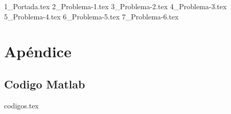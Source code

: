 \documentclass[a4paper,12pt,twoside]{all-in-one} %
\begin{document}
{1_Portada.tex}
\FloatBarrier
{2_Problema-1.tex}
\FloatBarrier 
{3_Problema-2.tex}
\FloatBarrier 
{4_Problema-3.tex}
\FloatBarrier 
{5_Problema-4.tex}
\FloatBarrier 
{6_Problema-5.tex}
\FloatBarrier 
{7_Problema-6.tex}
\FloatBarrier 

\appendix
\section{Apéndice} 
\subsection{Codigo Matlab} 
{codigos.tex}

\pagestyle{\auxsettings}
\printbibliography[heading=bibintoc]
\end{document}
